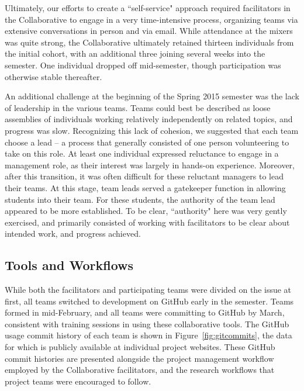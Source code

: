 \documentclass[12pt]{article}
\begin{document}
Ultimately, our efforts to create a ``self-service" approach required facilitators in the Collaborative to engage in a very time-intensive process, organizing teams via extensive conversations in person and via email. While attendance at the mixers was quite strong, the Collaborative ultimately retained thirteen individuals from the initial cohort, with an additional three joining several weeks into the semester. One individual dropped off mid-semester, though participation was otherwise stable thereafter.

An additional challenge at the beginning of the Spring 2015 semester was the lack of leadership in the various teams. Teams could best be described as loose assemblies of individuals working relatively independently on related topics, and progress was slow. Recognizing this lack of cohesion, we suggested that each team choose a lead -- a process that generally consisted of one person volunteering to take on this role. At least one individual expressed reluctance to engage in a management role, as their interest was largely in hands-on experience. Moreover, after this transition, it was often difficult for these reluctant managers to lead their teams.  At this stage, team leads served a gatekeeper function in allowing students into their team. For these students, the authority of the team lead appeared to be more established. To be clear, ``authority" here was very gently exercised, and primarily consisted of working with facilitators to be clear about intended work, and progress achieved.

\subsection{Tools and Workflows}

While both the facilitators and participating teams were divided on the issue at first, all teams switched to development on GitHub early in the semester. Teams formed in mid-February, and all teams were committing to GitHub by March, consistent with training sessions in using these collaborative tools.  The GitHub usage commit history of each team is shown in Figure~\ref{fig:gitcommits}, the data for which is publicly available at individual project websites.  These GitHub commit histories are presented alongside the project management workflow employed by the Collaborative facilitators, and the research workflows that project teams were encouraged to follow.
\end{document}
